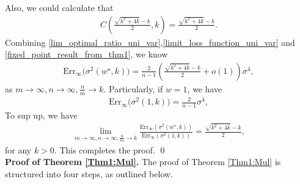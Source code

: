 Also, we could calculate that
\begin{align}
\label{fixed_point_result_from_thm1}
C(\frac{\sqrt{k^2+4k}-k}{2},k)=\frac{\sqrt{k^2+4k}-k}{2}.
\end{align}
Combining \eqref{lim_optimal_ratio_uni_var},\eqref{limit_loss_function_uni_var} and \eqref{fixed_point_result_from_thm1}, we know 
\begin{align}
\mathrm{Err}_{\infty}\big(\sigma^2(w^{\star},k)\big)=\frac{2}{n-1}( \frac{\sqrt{k^2+4k}-k}{2}+o(1)  )\sigma^4,
\end{align}
as $m \xrightarrow{} \infty, n\xrightarrow{} \infty, \frac{n}{m}\xrightarrow{}k$. Particularly, if $w=1$, we have
\begin{align*}
\mathrm{Err}_{\infty}\big(\sigma^2(1,k)\big)=\frac{2}{n-1}\sigma^4,
\end{align*}
To sup up, we have
\begin{align*}
    \lim_{m\to \infty, n\to \infty, \frac{n}{m}\to k}\frac{\mathrm{Err}_{\infty}(\sigma^2(w^{\star},k))}{\mathrm{Err}_{\infty}(\sigma^2(1,k))} = \frac{\sqrt{k^{2} + 4k} - k}{2},
\end{align*}
for any $k>0$. This completes the proof. \qed \\

\noindent
\textbf{Proof of Theorem \ref{Thm1:Mul}.} The proof of Theorem \ref{Thm1:Mul} is structured into four steps, as outlined below.

